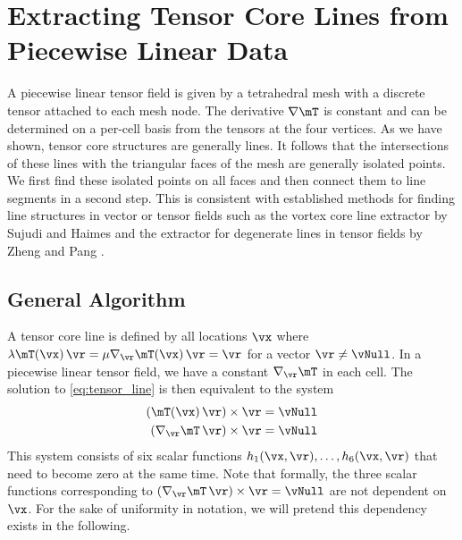 
%
\section{Extracting Tensor Core Lines from Piecewise Linear Data} %
\label{sec:extracting_tensor_lines}
%
A piecewise linear tensor field is given by a tetrahedral mesh with a discrete
tensor attached to each mesh node.
%
The derivative $\nabla \mT$ is constant and can be determined on a per-cell
basis from the tensors at the four vertices.
%
%
As we have shown, tensor core structures are generally lines.
%
It follows that the intersections of these lines with the triangular faces of
the mesh are generally isolated points.
%
We first find these isolated points on all faces and then connect them to line
segments in a second step.
%
This is consistent with established methods for finding line structures in
vector or tensor fields such as the vortex core line extractor by Sujudi and
Haimes \cite{Sujudi1995} and the extractor for degenerate lines in tensor fields
by Zheng and Pang \cite{Zheng2004}.
%

\subsection{General Algorithm} %
\label{sub:general_algorithm}
%
A tensor core line is defined by all locations $\vx$ where
$\lambda \mT(\vx) \, \vr = \mu \nabla_{\vr} \mT(\vx)\, \vr = \vr$
for a vector $\vr \neq \vNull$.
%
In a piecewise linear tensor field, we have a constant $\nabla_{\vr} \mT$
in each cell.
%
The solution to \eqref{eq:tensor_line} is then equivalent to the system
%
\begin{equation}\label{eq:targetfunctions}
\begin{aligned}
  (\mT(\vx)\,\vr) \times \vr &= \vNull\\
  (\nabla_{\vr} \mT\, \vr) \times \vr &= \vNull
\end{aligned}
\end{equation}
%
This system consists of six scalar functions $h_1(\vx, \vr), \dots, h_6(\vx,
\vr)$ that need to become zero at the same time.
%
Note that formally, the three scalar functions corresponding to $(\nabla_{\vr}
\mT\, \vr) \times \vr = \vNull$ are not dependent on $\vx$.
%
For the sake of uniformity in notation, we will pretend this dependency
exists in the following.
%

